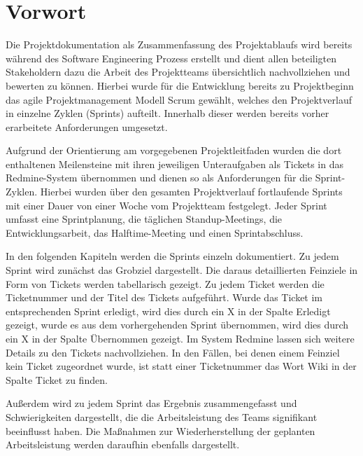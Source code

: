 \documentclass[a4paper,11pt,listof=numbered,glossary=totoc,parskip=half,toc=bib]{scrreprt}
\begin{document}
	
	\newpage
	\setcounter{tocdepth}{2}
	\tableofcontents	
	\renewcommand \thechapter{\Roman{chapter}}
	\listoftables
	\printglossaries

	


	
	\chapter{Vorwort}
	Die Projektdokumentation als Zusammenfassung des Projektablaufs wird bereits während des Software Engineering Prozess erstellt und dient allen beteiligten Stakeholdern dazu die Arbeit des Projektteams übersichtlich nachvollziehen und bewerten zu können. Hierbei wurde für die Entwicklung bereits zu Projektbeginn das agile Projektmanagement Modell Scrum gewählt, welches den Projektverlauf in einzelne Zyklen (Sprints) aufteilt. Innerhalb dieser werden bereits vorher erarbeitete Anforderungen umgesetzt. 
	
	Aufgrund der Orientierung am vorgegebenen Projektleitfaden wurden die dort enthaltenen Meilensteine mit ihren jeweiligen Unteraufgaben als Tickets in das Redmine-System übernommen und dienen so als Anforderungen für die Sprint-Zyklen. Hierbei wurden über den gesamten Projektverlauf fortlaufende Sprints mit einer Dauer von einer Woche vom Projektteam festgelegt. Jeder Sprint umfasst eine Sprintplanung, die täglichen Standup-Meetings, die Entwicklungsarbeit, das Halftime-Meeting und einen Sprintabschluss.

In den folgenden Kapiteln werden die Sprints einzeln dokumentiert. Zu jedem Sprint wird zunächst das Grobziel dargestellt. Die daraus detaillierten Feinziele in Form von Tickets werden tabellarisch gezeigt. Zu jedem Ticket werden die Ticketnummer und der Titel des Tickets aufgeführt. Wurde das Ticket im entsprechenden Sprint erledigt, wird dies durch ein X in der Spalte Erledigt gezeigt, wurde es aus dem vorhergehenden Sprint übernommen, wird dies durch ein X in der Spalte Übernommen gezeigt. Im System Redmine lassen sich weitere Details zu den Tickets nachvollziehen. In den Fällen, bei denen einem Feinziel kein Ticket zugeordnet wurde, ist statt einer Ticketnummer das Wort Wiki in der Spalte Ticket zu finden.

Außerdem wird zu jedem Sprint das Ergebnis zusammengefasst und Schwierigkeiten dargestellt, die die Arbeitsleistung des Teams signifikant beeinflusst haben. Die Maßnahmen zur Wiederherstellung der geplanten Arbeitsleistung werden daraufhin ebenfalls dargestellt.
\end{document}

